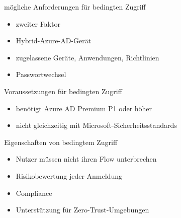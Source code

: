 \begin{flashcard}[Definition]{mögliche Anforderungen für bedingten Zugriff}
  \begin{itemize}
    \item zweiter Faktor
    \item Hybrid-Azure-AD-Gerät
    \item zugelassene Geräte, Anwendungen, Richtlinien
    \item Passwortwechsel
  \end{itemize}
\end{flashcard}

\begin{flashcard}[Definition]{Voraussetzungen für bedingten Zugriff}
  \begin{itemize}
    \item benötigt Azure AD Premium P1 oder höher
    \item nicht gleichzeitig mit Microsoft-Sicherheitsstandards
  \end{itemize}
\end{flashcard}

\begin{flashcard}[Definition]{Eigenschaften von bedingtem Zugriff}
  \begin{itemize}
    \item Nutzer müssen nicht ihren Flow unterbrechen
    \item Risikobewertung jeder Anmeldung
    \item Compliance
    \item Unterstützung für Zero-Trust-Umgebungen
  \end{itemize}
\end{flashcard}

